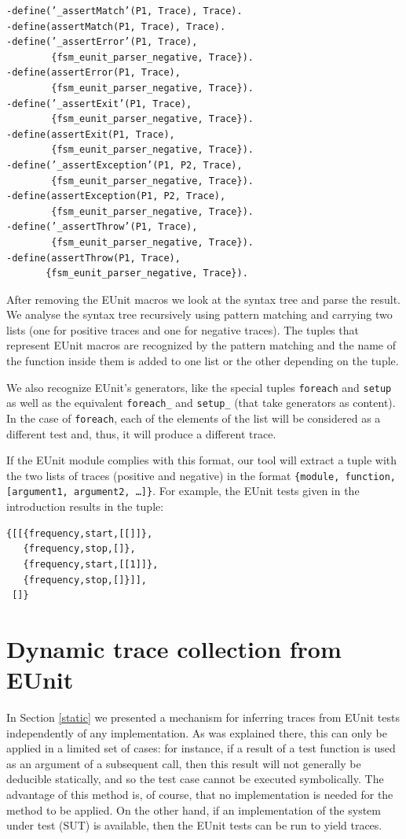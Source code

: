 \documentclass[]{sigplanconf}
\begin{document}
\begin{verbatim}
-define(’_assertMatch’(P1, Trace), Trace). 
-define(assertMatch(P1, Trace), Trace).
-define(’_assertError’(P1, Trace), 
        {fsm_eunit_parser_negative, Trace}).
-define(assertError(P1, Trace), 
        {fsm_eunit_parser_negative, Trace}).
-define(’_assertExit’(P1, Trace),
        {fsm_eunit_parser_negative, Trace}).
-define(assertExit(P1, Trace), 
        {fsm_eunit_parser_negative, Trace}).
-define(’_assertException’(P1, P2, Trace), 
        {fsm_eunit_parser_negative, Trace}).
-define(assertException(P1, P2, Trace), 
        {fsm_eunit_parser_negative, Trace}).
-define(’_assertThrow’(P1, Trace), 
        {fsm_eunit_parser_negative, Trace}).
-define(assertThrow(P1, Trace), 
       {fsm_eunit_parser_negative, Trace}).
\end{verbatim}

After removing the EUnit macros we look at the syntax tree and parse the result. We analyse the syntax tree recursively using pattern matching and carrying two lists (one for positive traces and one for negative traces). The tuples that represent EUnit macros are recognized by the pattern matching and the name of the function inside them is added to one list or the other depending on the tuple.


We also recognize EUnit's generators, like the special tuples \texttt{foreach} and
\texttt{setup} as well as the equivalent \texttt{foreach\_}
and \texttt{setup\_} (that take generators as content). In the case of \texttt{foreach},
each of the elements of the list will be considered as a different test
and, thus, it will produce a different trace.


If the EUnit module complies with this format, our tool will extract
a tuple with the two lists of traces (positive and negative) in the format
\texttt{\{module, function, [argument1, argument2, \ldots{}]\}}.
For example, the EUnit tests given in the introduction results in the tuple:
\begin{verbatim}
{[[{frequency,start,[[]]},
   {frequency,stop,[]},
   {frequency,start,[[1]]},
   {frequency,stop,[]}]],
 []}
\end{verbatim}

\section{Dynamic trace collection from EUnit}
\label{dynamic-collection}

In Section \ref{static} we presented a mechanism for inferring traces from EUnit tests independently of any implementation. As was explained there, this can only be applied in a limited set of cases: for instance, if a result of a test function is used as an argument of a subsequent call, then this result will not generally be deducible statically, and so the test case cannot be executed symbolically. The advantage of this method is, of course, that no implementation is needed  for the method to be applied.  
On the other hand, if an implementation of the system under test (SUT) is available, then the EUnit tests can be run to yield traces. 
\end{document}
